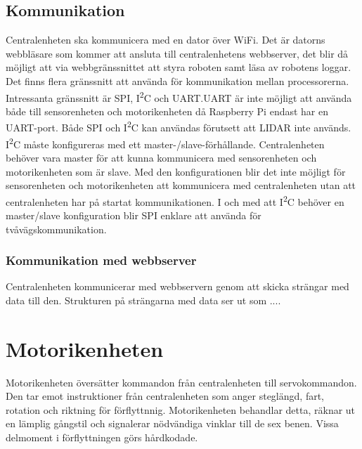 \documentclass[a4paper,titlepage,12pt]{article}
\newcommand{\itc}{I\textsuperscript{2}C}
\begin{document}
	\subsection{Kommunikation}
	Centralenheten ska kommunicera med en dator över WiFi. Det är datorns webbläsare 
	som kommer att ansluta till centralenhetens webbserver, det blir då möjligt att
	via webbgränssnittet att styra roboten samt läsa av robotens loggar. Det finns
	flera gränssnitt att 
	använda för kommunikation mellan processorerna. Intressanta gränssnitt är SPI, 
	\itc{} och UART.\@ UART är inte möjligt att använda både till sensorenheten och 
	motorikenheten då Raspberry Pi endast har en UART-port. Både 
	SPI och \itc{} kan användas förutsett att LIDAR inte används. \itc{} måste konfigureras med ett
	master-/slave-förhållande. Centralenheten behöver vara master för att kunna
	kommunicera med 
	sensorenheten och motorikenheten som är slave. Med den konfigurationen blir 
	det inte möjligt för sensorenheten och motorikenheten att kommunicera med
	centralenheten utan att centralenheten har på startat kommunikationen. I och 
	med att \itc{} behöver en master/slave konfiguration blir SPI enklare att använda 
	för tvåvägskommunikation.
	
	\subsubsection{Kommunikation med webbserver}
	Centralenheten kommunicerar med webbservern genom att skicka strängar med data till den. Strukturen på strängarna med data ser ut som ....

	\section{Motorikenheten}
	Motorikenheten översätter kommandon från centralenheten till servokommandon. Den tar emot 
	instruktioner från centralenheten som anger steglängd, fart, rotation och riktning för 
	förflyttnnig. Motorikenheten behandlar detta, räknar ut en lämplig gångstil och 
	signalerar nödvändiga vinklar till de sex benen. Vissa delmoment i förflyttningen 
	görs hårdkodade. 
	
\end{document}
